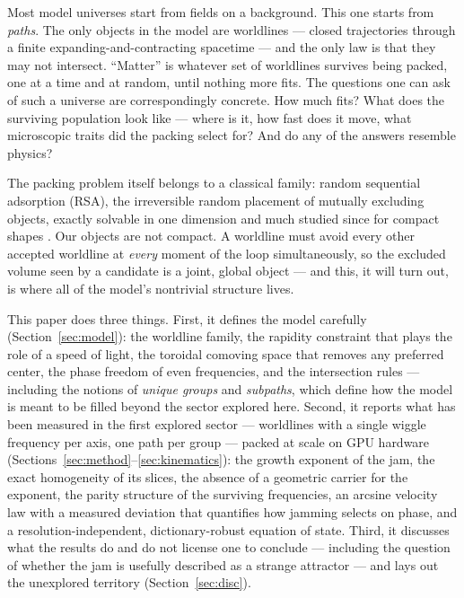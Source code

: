 \documentclass[11pt]{article}
\begin{document}
Most model universes start from fields on a background. This one starts from
\emph{paths}. The only objects in the model are worldlines --- closed
trajectories through a finite expanding-and-contracting spacetime --- and the
only law is that they may not intersect. ``Matter'' is whatever set of
worldlines survives being packed, one at a time and at random, until nothing
more fits. The questions one can ask of such a universe are correspondingly
concrete. How much fits? What does the surviving population look like ---
where is it, how fast does it move, what microscopic traits did the packing
select for? And do any of the answers resemble physics?

The packing problem itself belongs to a classical family: random sequential
adsorption (RSA), the irreversible random placement of mutually excluding
objects, exactly solvable in one dimension \cite{renyi} and much studied
since for compact shapes \cite{evans,torquato}. Our objects are not compact.
A worldline must avoid every other accepted worldline at \emph{every} moment
of the loop simultaneously, so the excluded volume seen by a candidate is a
joint, global object --- and this, it will turn out, is where all of the
model's nontrivial structure lives.

This paper does three things. First, it defines the model carefully
(Section~\ref{sec:model}): the worldline family, the rapidity constraint that
plays the role of a speed of light, the toroidal comoving space that removes
any preferred center, the phase freedom of even frequencies, and the
intersection rules --- including the notions of \emph{unique groups} and
\emph{subpaths}, which define how the model is meant to be filled beyond the
sector explored here. Second, it reports what has been measured in the first
explored sector --- worldlines with a single wiggle frequency per axis, one
path per group --- packed at scale on GPU hardware
(Sections~\ref{sec:method}--\ref{sec:kinematics}): the growth exponent of the
jam, the exact homogeneity of its slices, the absence of a geometric carrier
for the exponent, the parity structure of the surviving frequencies, an
arcsine velocity law with a measured deviation that quantifies how jamming
selects on phase, and a resolution-independent, dictionary-robust equation of
state. Third, it discusses what the results do and do not license one to
conclude --- including the question of whether the jam is usefully described
as a strange attractor --- and lays out the unexplored territory
(Section~\ref{sec:disc}).
\end{document}
